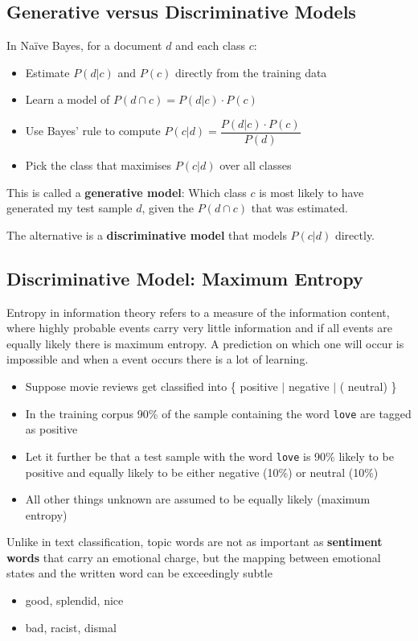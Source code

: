 \documentclass[11pt]{article}
\begin{document}
\subsection{Generative versus Discriminative Models}
In Naïve Bayes, for a document $d$ and each class $c$:
\begin{itemize}
	\item Estimate $P(d|c)$ and $P(c)$ directly from the training data
	\item Learn a model of $P(d\cap c) = P(d|c)\cdot P(c)$
	\item Use Bayes' rule to compute $P(c|d)=\dfrac{P(d|c)\cdot P(c)}{P(d)}$
	\item Pick the class that maximises $P(c|d)$ over all classes
\end{itemize}
This is called a \textbf{generative model}: Which class $c$ is most likely to have generated my test sample $d$, given the $P(d\cap c)$ that was estimated.

\noindent
The alternative is a \textbf{discriminative model} that models $P(c|d)$ directly.

\subsection{Discriminative Model: Maximum Entropy}
Entropy in information theory refers to a measure of the information content, where highly probable events carry very little information and if all events are equally likely there is maximum entropy. A prediction on which one will occur is impossible and when a event occurs there is a lot of learning.
\begin{itemize}
	\item Suppose movie reviews get classified into \{ {\color{Green3} positive} $\vert$ {\color{Firebrick3} negative} $\vert$ ({\color{gray} neutral}) \}
	\item In the training corpus 90\% of the sample containing the word \texttt{love} are tagged as {\color{Green3} positive}
	\item Let it further be that a test sample with the word \texttt{love} is 90\% likely to be positive and equally likely to be either {\color{Firebrick3} negative} (10\%) or {\color{gray} neutral} (10\%)
	\item All other things unknown are assumed to be equally likely (maximum entropy)
\end{itemize}
Unlike in text classification, topic words are not as important as \textbf{sentiment words} that carry an emotional charge, but the mapping between emotional states and the written word can be exceedingly subtle
\begin{itemize}[label=-]
	\item {\color{Green3} good}, {\color{Green3} splendid}, {\color{Green3} nice}
	\item {\color{Firebrick3} bad}, {\color{Firebrick3} racist}, {\color{Firebrick3} dismal}
\end{itemize}
\end{document}
